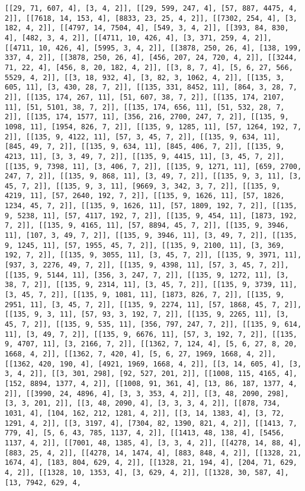 \documentclass[12pt,fleqn]{article}\usepackage{../../common}
\begin{document}
\begin{verbatim}
[[29, 71, 607, 4], [3, 4, 2]], [[29, 599, 247, 4], [57, 887, 4475, 4, 2]], [[7618, 14, 153, 4], [8833, 23, 25, 4, 2]], [[7302, 254, 4], [3, 182, 4, 2]], [[4797, 14, 7504, 4], [549, 3, 4, 2]], [[393, 84, 830, 4], [482, 3, 4, 2]], [[4711, 10, 426, 4], [3, 371, 259, 4, 2]], [[4711, 10, 426, 4], [5995, 3, 4, 2]], [[3878, 250, 26, 4], [138, 199, 337, 4, 2]], [[3878, 250, 26, 4], [456, 207, 24, 720, 4, 2]], [[3244, 71, 22, 4], [456, 8, 20, 182, 4, 2]], [[3, 8, 7, 4], [5, 6, 27, 566, 5529, 4, 2]], [[3, 18, 932, 4], [3, 82, 3, 1062, 4, 2]], [[135, 3, 605, 11], [3, 430, 28, 7, 2]], [[135, 331, 8452, 11], [864, 3, 28, 7, 2]], [[135, 174, 267, 11], [51, 607, 38, 7, 2]], [[135, 174, 2107, 11], [51, 5101, 38, 7, 2]], [[135, 174, 656, 11], [51, 532, 28, 7, 2]], [[135, 174, 1577, 11], [356, 216, 2700, 247, 7, 2]], [[135, 9, 1098, 11], [1954, 826, 7, 2]], [[135, 9, 1285, 11], [57, 1264, 192, 7, 2]], [[135, 9, 4122, 11], [57, 3, 45, 7, 2]], [[135, 9, 634, 11], [845, 49, 7, 2]], [[135, 9, 634, 11], [845, 406, 7, 2]], [[135, 9, 4213, 11], [3, 3, 49, 7, 2]], [[135, 9, 4415, 11], [3, 45, 7, 2]], [[135, 9, 7398, 11], [3, 406, 7, 2]], [[135, 9, 1271, 11], [659, 2700, 247, 7, 2]], [[135, 9, 868, 11], [3, 49, 7, 2]], [[135, 9, 3, 11], [3, 45, 7, 2]], [[135, 9, 3, 11], [9669, 3, 342, 3, 7, 2]], [[135, 9, 4219, 11], [57, 2640, 192, 7, 2]], [[135, 9, 1626, 11], [57, 1826, 1234, 45, 7, 2]], [[135, 9, 1626, 11], [57, 1809, 192, 7, 2]], [[135, 9, 5238, 11], [57, 4117, 192, 7, 2]], [[135, 9, 454, 11], [1873, 192, 7, 2]], [[135, 9, 4165, 11], [57, 8894, 45, 7, 2]], [[135, 9, 3946, 11], [107, 3, 49, 7, 2]], [[135, 9, 3946, 11], [3, 49, 7, 2]], [[135, 9, 1245, 11], [57, 1955, 45, 7, 2]], [[135, 9, 2100, 11], [3, 369, 192, 7, 2]], [[135, 9, 3055, 11], [3, 45, 7, 2]], [[135, 9, 3971, 11], [937, 3, 2276, 49, 7, 2]], [[135, 9, 4398, 11], [57, 3, 45, 7, 2]], [[135, 9, 5144, 11], [356, 3, 247, 7, 2]], [[135, 9, 1272, 11], [3, 38, 7, 2]], [[135, 9, 2314, 11], [3, 45, 7, 2]], [[135, 9, 3739, 11], [3, 45, 7, 2]], [[135, 9, 1081, 11], [1873, 826, 7, 2]], [[135, 9, 2951, 11], [3, 45, 7, 2]], [[135, 9, 2274, 11], [57, 1868, 45, 7, 2]], [[135, 9, 3, 11], [57, 93, 3, 192, 7, 2]], [[135, 9, 2265, 11], [3, 45, 7, 2]], [[135, 9, 535, 11], [356, 797, 247, 7, 2]], [[135, 9, 614, 11], [3, 49, 7, 2]], [[135, 9, 6676, 11], [57, 3, 192, 7, 2]], [[135, 9, 4707, 11], [3, 2166, 7, 2]], [[1362, 7, 124, 4], [5, 6, 27, 8, 20, 1668, 4, 2]], [[1362, 7, 420, 4], [5, 6, 27, 1969, 1668, 4, 2]], [[1362, 420, 190, 4], [4921, 1969, 1668, 4, 2]], [[3, 14, 605, 4], [3, 3, 4, 2]], [[3, 301, 298], [92, 527, 201, 2]], [[1008, 115, 4165, 4], [152, 8894, 1377, 4, 2]], [[1008, 91, 361, 4], [13, 86, 187, 1377, 4, 2]], [[3990, 24, 4896, 4], [3, 3, 353, 4, 2]], [[3, 48, 2090, 298], [3, 3, 201, 2]], [[3, 48, 2090, 4], [3, 3, 3, 4, 2]], [[878, 734, 1031, 4], [104, 162, 212, 1281, 4, 2]], [[3, 14, 1383, 4], [3, 72, 1291, 4, 2]], [[3, 3197, 4], [7304, 82, 1390, 821, 4, 2]], [[1413, 7, 779, 4], [5, 6, 43, 785, 1137, 4, 2]], [[1413, 48, 138, 4], [5456, 1137, 4, 2]], [[7001, 48, 1385, 4], [3, 3, 4, 2]], [[4278, 14, 88, 4], [883, 25, 4, 2]], [[4278, 14, 1474, 4], [883, 848, 4, 2]], [[1328, 21, 1674, 4], [183, 804, 629, 4, 2]], [[1328, 21, 194, 4], [204, 71, 629, 4, 2]], [[1328, 10, 1353, 4], [3, 629, 4, 2]], [[1328, 30, 587, 4], [13, 7942, 629, 4, 
\end{verbatim}
\end{document}
